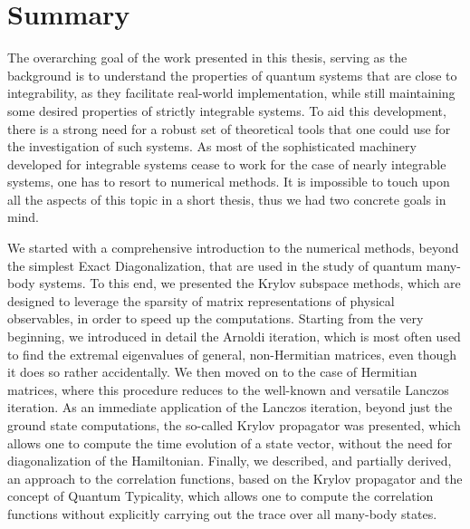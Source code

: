\chapter{Summary}
\thispagestyle{chapterBeginStyle}


The overarching goal of the work presented in this thesis, serving as the background is to understand the properties of
quantum systems that are close to integrability, as they facilitate real-world implementation, while
still maintaining some desired properties of strictly integrable systems.
To aid this development, there is a strong need for a robust set of theoretical tools that one
could use for the investigation of such systems. As most of the sophisticated machinery developed
for integrable systems cease to work for the case of nearly integrable systems, one has
to resort to numerical methods. It is impossible to touch upon all the aspects of this
topic in a short thesis, thus we had two concrete goals in mind.

We started with a comprehensive introduction to the numerical methods, beyond the simplest Exact
Diagonalization, that are used in the study of quantum many-body systems. To this end, we presented
the Krylov subspace methods, which are designed to leverage the sparsity of matrix representations of
physical observables, in order to speed up the computations. Starting from the very beginning, we
introduced in detail the Arnoldi iteration, which is most often used to find the extremal eigenvalues
of general, non-Hermitian matrices, even though it does so rather accidentally. We then moved on to
the case of Hermitian matrices, where this procedure reduces to the well-known and versatile
Lanczos iteration. As an immediate application of the Lanczos iteration, beyond just the ground state
computations, the so-called Krylov propagator was presented, which allows one to compute the time evolution of
a state vector, without the need for diagonalization of the Hamiltonian. Finally, we described,
and partially derived, an approach to the correlation functions, based on the Krylov
propagator and the concept of Quantum Typicality, which allows one to compute the correlation functions
without explicitly carrying out the trace over all many-body states.

